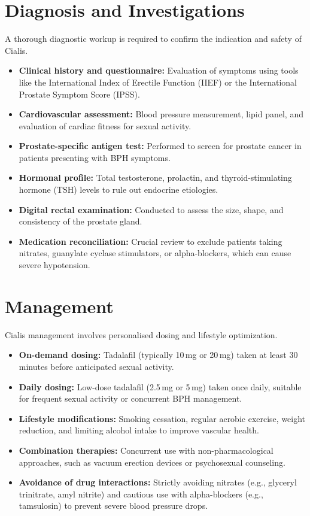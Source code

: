 \section*{Diagnosis and Investigations}
A thorough diagnostic workup is required to confirm the indication and safety of Cialis.
\begin{itemize}
    \item \textbf{Clinical history and questionnaire:} Evaluation of symptoms using tools like the International Index of Erectile Function (IIEF) or the International Prostate Symptom Score (IPSS).
    \item \textbf{Cardiovascular assessment:} Blood pressure measurement, lipid panel, and evaluation of cardiac fitness for sexual activity.
    \item \textbf{Prostate-specific antigen test:} Performed to screen for prostate cancer in patients presenting with BPH symptoms.
    \item \textbf{Hormonal profile:} Total testosterone, prolactin, and thyroid-stimulating hormone (TSH) levels to rule out endocrine etiologies.
    \item \textbf{Digital rectal examination:} Conducted to assess the size, shape, and consistency of the prostate gland.
    \item \textbf{Medication reconciliation:} Crucial review to exclude patients taking nitrates, guanylate cyclase stimulators, or alpha-blockers, which can cause severe hypotension.
\end{itemize}

\section*{Management}
Cialis management involves personalised dosing and lifestyle optimization.
\begin{itemize}
    \item \textbf{On-demand dosing:} Tadalafil (typically 10\,mg or 20\,mg) taken at least 30 minutes before anticipated sexual activity.
    \item \textbf{Daily dosing:} Low-dose tadalafil (2.5\,mg or 5\,mg) taken once daily, suitable for frequent sexual activity or concurrent BPH management.
    \item \textbf{Lifestyle modifications:} Smoking cessation, regular aerobic exercise, weight reduction, and limiting alcohol intake to improve vascular health.
    \item \textbf{Combination therapies:} Concurrent use with non-pharmacological approaches, such as vacuum erection devices or psychosexual counseling.
    \item \textbf{Avoidance of drug interactions:} Strictly avoiding nitrates (e.g., glyceryl trinitrate, amyl nitrite) and cautious use with alpha-blockers (e.g., tamsulosin) to prevent severe blood pressure drops.
\end{itemize}

